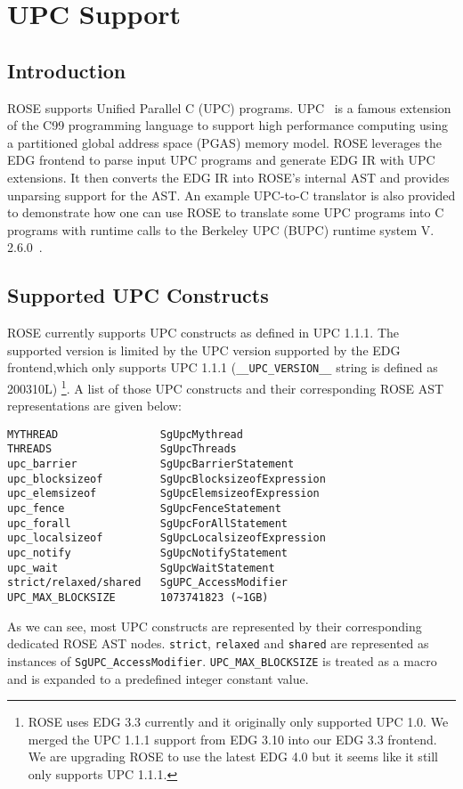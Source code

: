 \chapter{UPC Support}
\label{chap::upcsupport}

\section{Introduction}
ROSE supports Unified Parallel C (UPC) programs.
UPC~\cite{UPC:Web} is a famous extension of the C99 programming language to support high performance computing using a partitioned global address space (PGAS) memory model.
ROSE leverages the EDG frontend to parse input UPC programs and generate EDG IR with UPC extensions.
It then converts the EDG IR into ROSE's internal AST and provides unparsing support for the AST.
An example UPC-to-C translator is also provided to demonstrate how one can use ROSE to 
translate some UPC programs into C programs with runtime calls to the Berkeley UPC (BUPC) runtime system V. 2.6.0~\cite{BUPC:Web}.

\section{Supported UPC Constructs}
ROSE currently supports UPC constructs as defined in UPC 1.1.1.
The supported version is limited by the UPC version supported by the EDG frontend,which only supports UPC 1.1.1 (\lstinline{__UPC_VERSION__} string is defined as 200310L)
\footnote{ROSE uses EDG 3.3 currently and it originally only supported UPC 1.0. 
We merged the UPC 1.1.1 support from EDG 3.10 into our EDG 3.3 frontend. We
are upgrading ROSE to use the latest EDG 4.0 but it seems like it still
only supports UPC 1.1.1.}.
A list of those UPC constructs and their corresponding ROSE AST representations are given below:
\begin{verbatim}
MYTHREAD                SgUpcMythread
THREADS                 SgUpcThreads
upc_barrier             SgUpcBarrierStatement
upc_blocksizeof         SgUpcBlocksizeofExpression
upc_elemsizeof          SgUpcElemsizeofExpression
upc_fence               SgUpcFenceStatement
upc_forall              SgUpcForAllStatement
upc_localsizeof         SgUpcLocalsizeofExpression
upc_notify              SgUpcNotifyStatement
upc_wait                SgUpcWaitStatement
strict/relaxed/shared   SgUPC_AccessModifier
UPC_MAX_BLOCKSIZE       1073741823 (~1GB)
\end{verbatim}
As we can see, most UPC constructs are represented by their corresponding dedicated ROSE AST nodes. 
\lstinline{strict}, \lstinline{relaxed} and \lstinline{shared} are
represented as instances of \lstinline{SgUPC_AccessModifier}.
\lstinline{UPC_MAX_BLOCKSIZE} is treated as a macro and is expanded to a predefined integer constant value.

